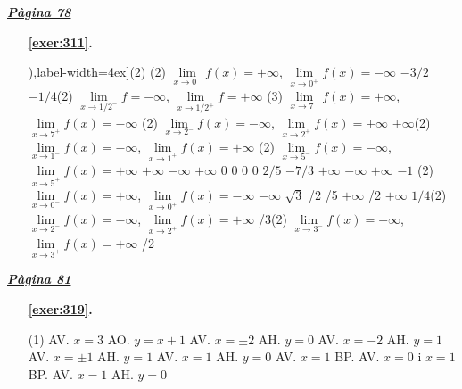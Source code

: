 
\hyperlink{page.78}{\textbf{\em Pàgina 78}}
\begin{enumerate}
\item[\fontfamily{phv}\selectfont\color{blue}\textbf{\ref{exer:311}. }] \label{ans:311} 
\begin{tasks}[counter-format=(tsk[1]),label-width=4ex](2) \task *(2) $\mathop {lim}\limits _{x\to 0^- } f(x)=+\infty $, $\mathop {lim}\limits _{x\to 0^+ } f(x)=-\infty $ \task $-3/2$ \task $-1/4$\startnewitemline \task *(2) $\mathop {lim}\limits _{x\to 1/2^- } f=-\infty $, $\mathop {lim}\limits _{x\to 1/2^+ } f=+\infty $ \startnewitemline \task *(3) $\mathop {lim}\limits _{x\to 7^- } f(x)=+\infty $, $\mathop {lim}\limits _{x\to 7^+ } f(x)=-\infty $ \task *(2) $\mathop {lim}\limits _{x\to 2^- } f(x)=-\infty $, $\mathop {lim}\limits _{x\to 2^+ } f(x)=+\infty $ \task $+\infty $\startnewitemline \task *(2) $\mathop {lim}\limits _{x\to 1^- } f(x)=-\infty $, $\mathop {lim}\limits _{x\to 1^+ } f(x)=+\infty $ \startnewitemline \task *(2) $\mathop {lim}\limits _{x\to 5^- } f(x)=-\infty $, $\mathop {lim}\limits _{x\to 5^+ } f(x)=+\infty $  \task $+\infty $ \task $-\infty $ \task $+\infty $ \task $0$ \task $0$ \task $0$ \task $0$ \task $2/5$ \task $-7/3$ \task $+\infty $ \task $-\infty $ \task $+\infty $ \task $-1$ \task *(2) $\mathop {lim}\limits _{x\to 0^- } f(x)=+\infty $, $\mathop {lim}\limits _{x\to 0^+ } f(x)=-\infty $ \task $-\infty $ \task $\sqrt {3}$ /2  /5 \task $+\infty $ /2   \task $+\infty $ \task $1/4$\startnewitemline \task *(2) $\mathop {lim}\limits _{x\to 2^- } f(x)=-\infty $, $\mathop {lim}\limits _{x\to 2^+ } f(x)=+\infty $  /3\startnewitemline \task *(2) $\mathop {lim}\limits _{x\to 3^- } f(x)=-\infty $, $\mathop {lim}\limits _{x\to 3^+ } f(x)=+\infty $ /2 \end{tasks}
 \end{enumerate}
\vspace{0.3cm}


\hyperlink{page.81}{\textbf{\em Pàgina 81}}
\begin{enumerate}



 \item[\fontfamily{phv}\selectfont\color{blue}\textbf{\ref{exer:319}. }] \label{ans:319}
 \begin{tasks}[column-sep=1em, item-indent=1.3333em](1)
	 \task AV. $x=3$ AO. $y=x+1$
	 \task AV. $x=\pm 2$ AH. $y=0$
	 \task AV. $x=- 2$ AH. $y=1$
	 \task AV. $x=\pm 1$ AH. $y=1$
	 \task AV. $x=1$ AH. $y=0$
	 \task AV. $x=1$ BP.
	 \task AV. $x=0$ i $x=1$ BP.
	 \task AV. $x=1$ AH. $y=0$
\end{tasks}
 \end{enumerate}
\vspace{0.3cm}

